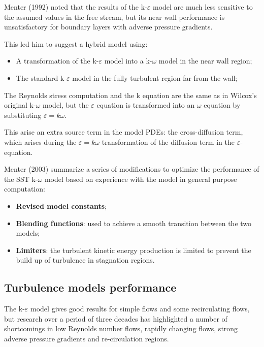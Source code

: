 \documentclass[a4paper, 15pt]{article}
\begin{document}
	Menter (1992) noted that the results of the k-$\varepsilon$ model are much less sensitive to the assumed values in the free stream, but its near wall performance is unsatisfactory for boundary
	layers with adverse pressure gradients. \newline 
	
	This
	led him to suggest a hybrid model using:
	\begin{itemize}
		\item A transformation of the k-$\varepsilon$ model into a k-$\omega$
		model in the near wall region;
		\item The standard k-$\varepsilon$ model in the fully turbulent region far from the wall;
	\end{itemize}  

	The
	Reynolds stress computation and the k equation are the same as in Wilcox’s original k-$\omega$
	model, but the $\varepsilon$ equation is transformed into an $\omega$ equation by substituting $\varepsilon = k\omega$. \newline 
	
	This arise an extra source term in the model PDEs: the cross-diffusion term,
	which arises during the $\varepsilon = k\omega$ transformation of the diffusion term in the $\varepsilon$-equation. \newline 
	
	Menter (2003) summarize a series of modifications to optimize the performance of the SST
	k-$\omega$ model based on experience with the model in general purpose computation:
	\begin{itemize}
		\item \textbf{Revised model constants};
		\item \textbf{Blending
			functions}: used to achieve a smooth transition between the two models;
		\item \textbf{Limiters}: the turbulent kinetic energy production is limited to
		prevent the build up of turbulence in stagnation regions. 			
	\end{itemize}


\subsection{Turbulence models performance}

	The
	k-$\varepsilon$ model gives good results for simple flows and some recirculating flows, but research
	over a period of three decades has highlighted a number of shortcomings in low Reynolds number flows, rapidly changing flows, strong adverse pressure gradients and re-circulation
	regions. \newline 
	
\end{document}
